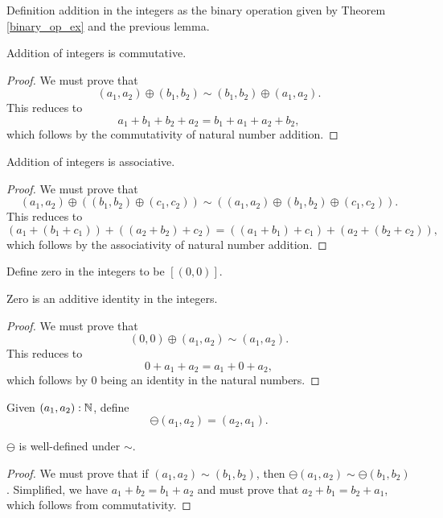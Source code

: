 \documentclass[../../math.tex]{subfiles}
\begin{document}
\begin{instance}
    Definition addition in the integers as the binary operation given by Theorem
    \ref{binary_op_ex} and the previous lemma.
\end{instance}

\begin{instance}
    Addition of integers is commutative.
\end{instance}
\begin{proof}
    We must prove that
    \[
        (a_1, a_2) \oplus (b_1, b_2) \sim (b_1, b_2) \oplus (a_1, a_2).
    \]
    This reduces to
    \[
        a_1 + b_1 + b_2 + a_2 = b_1 + a_1 + a_2 + b_2,
    \]
    which follows by the commutativity of natural number addition.
\end{proof}

\begin{instance}
    Addition of integers is associative.
\end{instance}
\begin{proof}
    We must prove that
    \[
        (a_1, a_2) \oplus ((b_1, b_2) \oplus (c_1, c_2)) \sim
        ((a_1, a_2) \oplus (b_1, b_2) \oplus (c_1, c_2)).
    \]
    This reduces to
    \[
        (a_1 + (b_1 + c_1)) + ((a_2 + b_2) + c_2) =
        ((a_1 + b_1) + c_1) + (a_2 + (b_2 + c_2)),
    \]
    which follows by the associativity of natural number addition.
\end{proof}

\begin{instance}
    Define zero in the integers to be $[(0, 0)]$.
\end{instance}

\begin{instance}
    Zero is an additive identity in the integers.
\end{instance}
\begin{proof}
    We must prove that
    \[
        (0, 0) \oplus (a_1, a_2) \sim (a_1, a_2).
    \]
    This reduces to
    \[
        0 + a_1 + a_2 = a_1 + 0 + a_2,
    \]
    which follows by 0 being an identity in the natural numbers.
\end{proof}

\begin{definition}
    Given $(a_1, a_2) : \mathbb{N}$, define
    \[
        \ominus (a_1, a_2) = (a_2, a_1).
    \]
\end{definition}

\begin{lemma}
    $\ominus$ is well-defined under $\sim$.
\end{lemma}
\begin{proof}
    We must prove that if $(a_1, a_2) \sim (b_1, b_2)$, then $\ominus (a_1, a_2)
    \sim \ominus (b_1, b_2)$.  Simplified, we have $a_1 + b_2 = b_1 + a_2$ and
    must prove that $a_2 + b_1 = b_2 + a_1$, which follows from commutativity.
\end{proof}
\end{document}
